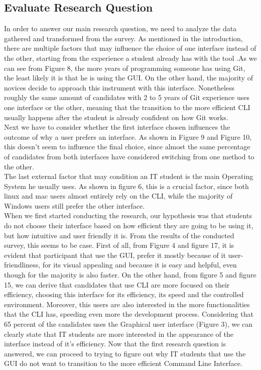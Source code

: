 \documentclass[]{report}
\begin{document}
	\subsection{Evaluate Research Question}
	In order to answer our main research question, we need to analyze the data gathered and transformed from the survey.
	As mentioned in the introduction, there are multiple factors that may influence the choice of one interface instead of the other, starting from the experience a student already has with the tool .As we can see from Figure 8, the more years of programming someone has using Git, the least likely it is that he is using the GUI. On the other hand, the majority of novices decide to approach this instrument with this interface. Nonetheless roughly the same amount of candidates with 2 to 5 years of Git experience uses one interface or the other, meaning that the transition to the more efficient CLI usually happens after the student is already confident on how Git works.\\
	Next we have to consider whether the first interface chosen influences the outcome of why a user prefers an interface. As shown in Figure 9 and Figure 10, this doesn't seem to  influence the final choice, since almost the same percentage of candidates from both interfaces have considered switching from one method to the other.\\
	The last external factor that may condition an IT student is the main Operating System he usually uses. As shown in figure 6, this is a crucial factor, since both linux and mac users almost entirely rely on the CLI, while the majority of Windows users still prefer the other interface.\\
	When we first started conducting the research, our hypothesis was that students do not choose their interface based on how efficient they are going to be using it, but how intuitive and user friendly it is.
	From the results of the conducted survey, this seems to be case.
	First of all, from Figure 4 and figure 17, it is evident that participant that use the GUI, prefer it mostly because of it user-friendliness, for its visual appealing and because it is easy and helpful, even though for the majority is also faster.
	On the other hand, from figure 5 and figure 15, we can derive that candidates that use CLI are more focused on their efficiency, choosing this interface for its efficiency, its speed and the controlled environment. Moreover, this users are also interested in the more functionalities that the CLI has, speeding even more the development process.
	Considering that 65  percent of the candidates uses the Graphical user interface (Figure 3), we can clearly state that IT students are more interested in the appearance of the interface instead of it's efficiency.
	Now that the first research question is answered, we can proceed to trying to figure out why IT students that use the GUI do not want to transition to the more efficient Command Line Interface.
\end{document}
